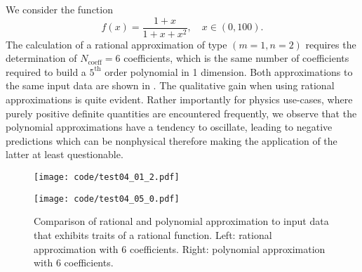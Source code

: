 We consider the function $$f(x) = \frac{1 + x}{1 + x + x^2},\quad
x\in(0,100).$$ The calculation of a rational approximation of type $(m=1, n=2)$
requires the determination of $N_\text{coeff}=6$ coefficients, which is the
same number of coefficients required to build a $5^\text{th}$ order polynomial
in 1 dimension.  Both approximations to the same input data are shown in
. The qualitative gain when using rational approximations is
quite evident. Rather importantly for physics use-cases, where purely positive
definite quantities are encountered frequently, we observe that the polynomial
approximations have a tendency to oscillate, leading to negative predictions
which can be nonphysical therefore making the application of the latter at least
questionable.

\begin{figure}[!h]
    \begin{minipage}{.48\textwidth}%
        \begin{center}
            \texttt{[image: code/test04\_01\_2.pdf]}
        \end{center}
    \end{minipage}%
    \begin{minipage}{.04\textwidth}%
    \end{minipage}%
    \begin{minipage}{.48\textwidth}%
        \begin{center}
            \texttt{[image: code/test04\_05\_0.pdf]}
        \end{center}
    \end{minipage}%
    \centering
    \caption{Comparison of rational and polynomial approximation to input data
    that exhibits traits of a rational function. Left: rational approximation
with 6 coefficients. Right: polynomial approximation with 6 coefficients.}
    \label{fig:cmp}
\end{figure}






